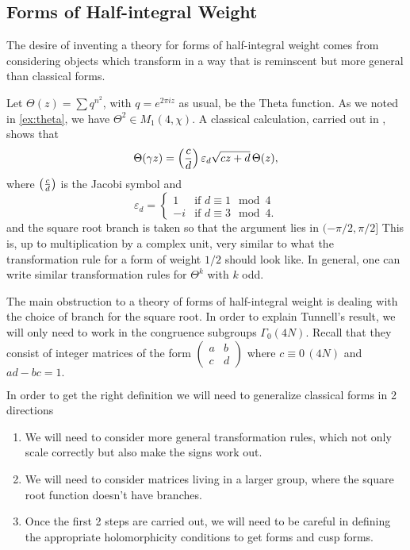 \documentclass[12pt, a4paper]{amsart}
\begin{document}
\subsection{Forms of Half-integral Weight}

The desire of inventing a theory for forms of half-integral weight comes from
considering objects which transform in a way that is reminscent but more general
than classical forms.

\begin{example}
  Let $\Theta(z) = \sum q^{n^2}$, with $q = e^{2 \pi i z}$ as usual, be the
  Theta function.
  As we noted in
  \ref{ex:theta}, we have $\Theta^2 \in M_1(4,\chi)$. A classical calculation,
  carried out in \cite[Chapter III-4, Pages 148-149]{koblitz}, shows that
  \[\Theta(\gamma z) = \left(\frac{c}{d}\right) \varepsilon_d \sqrt{cz+d} \,  \Theta(z),\]
  where $\left(\frac{c}{d}\right)$ is the Jacobi symbol and
  \[\varepsilon_d =
    \begin{cases}
      1 & \text{if } d \equiv 1 \mod{4} \\ 
      -i & \text{if } d \equiv 3 \mod{4}.
    \end{cases}
  \]
  and the square root branch is taken so that the argument lies in $(-\pi/2,
  \pi/2 ]$
  This is, up to multiplication by a complex unit, very similar to what the
  transformation rule for a form of weight $1/2$ should look like.
  In general, one can write similar
  transformation rules for $\Theta^k$ with $k$ odd. 
\end{example}

The main obstruction to a theory of forms of half-integral weight is dealing
with the choice of branch for the square root. In order to explain Tunnell's
result, we will only need to work in the congruence subgroups $\Gamma_0(4N)$.
Recall that they consist of integer matrices of the form $
\left( \begin{smallmatrix}
  a & b \\ c & d
\end{smallmatrix} \right)
$ where $c \equiv 0 \, (4N)$ and $ad - bc = 1.$

In order to get the right definition we will need to generalize classical forms
in 2 directions
\begin{enumerate}
\item We will need to consider more general transformation rules, which not only
  scale correctly but also make the signs work out.
\item We will need to consider matrices living in a larger group, where the
  square root function doesn't have branches.
\item Once the first 2 steps are carried out, we will need to be careful in
  defining the appropriate holomorphicity conditions to get forms and cusp forms.
\end{enumerate}
\end{document}
